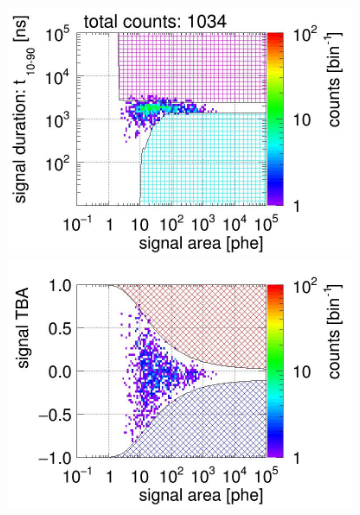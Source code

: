 \begin{landscape}
\begin{figure}[!p]
\begin{subfigure}[t]{0.32\textwidth}
			\caption{}
			\label{fig:signal selection dv 12 03}
		\end{subfigure}
		\begin{subfigure}[t]{0.32\textwidth}
			\centering
			\includegraphics[width=\figurewidth,clip,trim={0 98 0 15}]{Figures/GasTest/CutsValid/res64767/pdpa29Vecfig64767.jpg}
			\includegraphics[width=\figurewidth,clip,trim={0 98 0 40}]{Figures/GasTest/CutsValid/res64767/tbapa29Vecfig64767.jpg}

\end{subfigure}
\end{figure}
\end{landscape}
